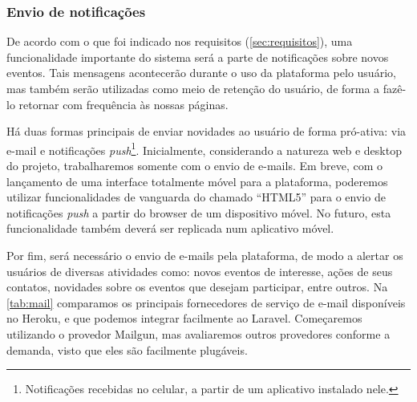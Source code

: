 \documentclass[12pt,a4paper,twoside,hyphens,english,brazil]{abntex2}
\begin{document}
{\subsubsection*{Envio de notificações}
De acordo com o que foi indicado nos requisitos (\autoref{sec:requisitos}), uma funcionalidade importante do sistema será a parte de notificações sobre novos eventos. Tais mensagens acontecerão durante o uso da plataforma pelo usuário, mas também serão utilizadas como meio de retenção do usuário, de forma a fazê-lo retornar com frequência às nossas páginas.

Há duas formas principais de enviar novidades ao usuário de forma pró-ativa: via e-mail e notificações \emph{push}\footnote{Notificações recebidas no celular, a partir de um aplicativo instalado nele.}. Inicialmente, considerando a natureza web e desktop do projeto, trabalharemos somente com o envio de e-mails. Em breve, com o lançamento de uma interface totalmente móvel para a plataforma, poderemos utilizar funcionalidades de vanguarda do chamado ``HTML5'' para o envio de notificações \emph{push} a partir do browser de um dispositivo móvel. No futuro, esta funcionalidade também deverá ser replicada num aplicativo móvel.



Por fim, será necessário o envio de e-mails pela plataforma, de modo a alertar os usuários de diversas atividades como: novos eventos de interesse, ações de seus contatos, novidades sobre os eventos que desejam participar, entre outros. Na \autoref{tab:mail} comparamos os principais fornecedores de serviço de e-mail disponíveis no Heroku, e que podemos integrar facilmente ao Laravel\cite{laravel-mail}. Começaremos utilizando o provedor Mailgun, mas avaliaremos outros provedores conforme a demanda, visto que eles são facilmente plugáveis.

}
\end{document}
